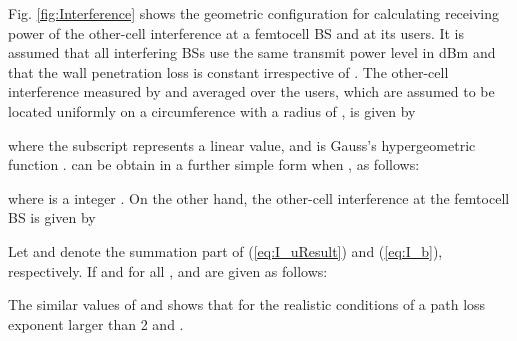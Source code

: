 \documentclass[draftclsnofoot,12pt,onecolumn]{IEEEtran}
\begin{document}
\appendix[]
Fig. \ref{fig:Interference} shows the geometric configuration for
calculating receiving power of the other-cell interference at a
femtocell BS and at its users. It is assumed that all 
interfering BSs use the same transmit power level  in dBm and
that the wall penetration loss  is constant irrespective of
. The other-cell interference measured by and averaged over
the users, which are assumed to be located uniformly on a
circumference with a radius of , is given by

where the subscript  represents a linear value, and
 is Gauss's hypergeometric function \cite{HyperGeo}.
 can be obtain in a further simple form when
, as follows:

where  is a integer \cite{HyperGeo}. On the other hand, the
other-cell interference at the femtocell BS is given by

Let  and  denote the summation part of (\ref{eq:I_uResult})
and (\ref{eq:I_b}), respectively. If  and  for all ,  and  are given as follows:

The similar values of  and  shows that  for the realistic conditions of a
path loss exponent  larger than 2 and .
\end{document}
